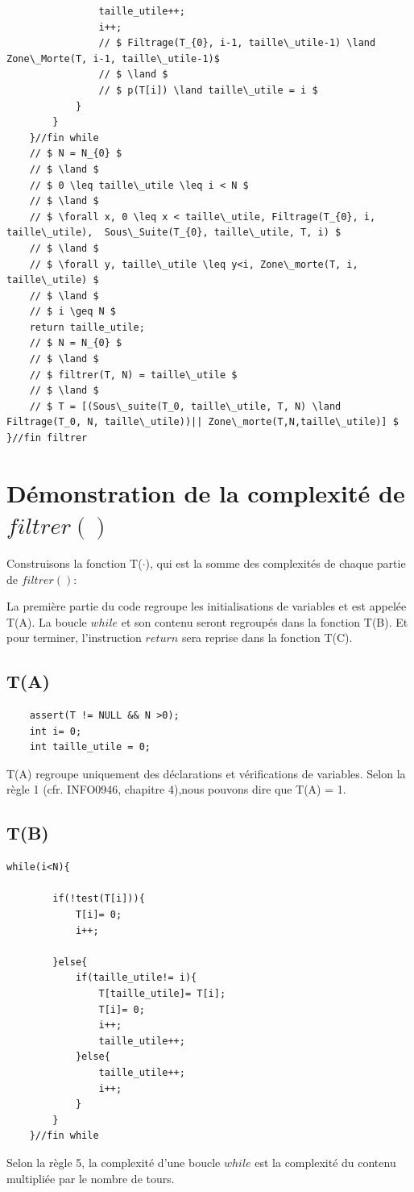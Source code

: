\documentclass[a4paper, 11pt, oneside]{article}
\begin{document}
\begin{lstlisting}
                taille_utile++;
                i++;
                // $ Filtrage(T_{0}, i-1, taille\_utile-1) \land  Zone\_Morte(T, i-1, taille\_utile-1)$
                // $ \land $
                // $ p(T[i]) \land taille\_utile = i $
            }
        }
    }//fin while
    // $ N = N_{0} $
    // $ \land $
    // $ 0 \leq taille\_utile \leq i < N $
    // $ \land $
    // $ \forall x, 0 \leq x < taille\_utile, Filtrage(T_{0}, i, taille\_utile),  Sous\_Suite(T_{0}, taille\_utile, T, i) $
    // $ \land $
    // $ \forall y, taille\_utile \leq y<i, Zone\_morte(T, i, taille\_utile) $
    // $ \land $
    // $ i \geq N $
    return taille_utile;
    // $ N = N_{0} $
    // $ \land $
    // $ filtrer(T, N) = taille\_utile $
    // $ \land $
    // $ T = [(Sous\_suite(T_0, taille\_utile, T, N) \land Filtrage(T_0, N, taille\_utile))|| Zone\_morte(T,N,taille\_utile)] $
}//fin filtrer
\end{lstlisting}

\section{Démonstration de la complexité de $filtrer()$}
Construisons la fonction T($\cdot$), qui est la somme des complexités de chaque partie de $filtrer()$:


La première partie du code regroupe les initialisations de variables et est appelée T(A). La boucle $while$ et son contenu seront regroupés dans la fonction T(B). Et pour terminer, l'instruction $return$ sera reprise dans la fonction T(C).

\subsection{T(A)}

\begin{lstlisting}
    assert(T != NULL && N >0);
    int i= 0;
    int taille_utile = 0;
\end{lstlisting}

T(A) regroupe uniquement des déclarations et vérifications de variables. Selon la règle 1 (cfr. INFO0946, chapitre 4),nous pouvons dire que T(A) = 1.


\subsection{T(B)}

\begin{lstlisting}
while(i<N){
          
        if(!test(T[i])){
            T[i]= 0;
            i++;
            
        }else{
            if(taille_utile!= i){
                T[taille_utile]= T[i];
                T[i]= 0;
                i++;
                taille_utile++;
            }else{
                taille_utile++;
                i++;
            }
        }
    }//fin while
\end{lstlisting}
Selon la règle 5, la complexité d'une boucle $while$ est la complexité du contenu multipliée par le nombre de tours.
\end{document}
